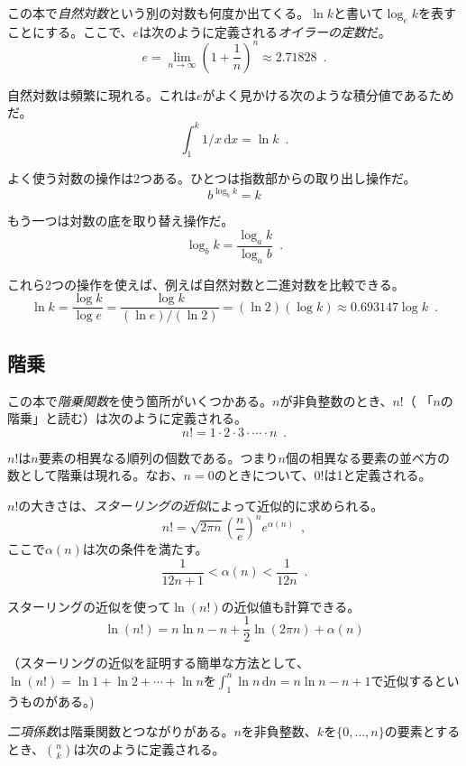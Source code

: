 %
%
この本で\emph{自然対数}という別の対数も何度か出てくる。$\ln k$と書いて$\log_e k$を表すことにする。ここで、$e$は次のように定義される\emph{オイラーの定数}だ。
%
%
\[
   e = \lim_{n\rightarrow\infty} \left(1+\frac{1}{n}\right)^n
   \approx  2.71828 \enspace .
\]

自然対数は頻繁に現れる。これは$e$がよく見かける次のような積分値であるためだ。
\[
    \int_{1}^{k} 1/x\,\mathrm{d}x  = \ln k \enspace .
\]

よく使う対数の操作は2つある。ひとつは指数部からの取り出し操作だ。
\[
    b^{\log_b k} = k
\]

もう一つは対数の底を取り替え操作だ。
\[
    \log_b k = \frac{\log_a k}{\log_a b} \enspace .
\]

これら2つの操作を使えば、例えば自然対数と二進対数を比較できる。
\[
   \ln k = \frac{\log k}{\log e} = \frac{\log k}{(\ln e)/(\ln 2)} =
    (\ln 2)(\log k) \approx 0.693147\log k \enspace .
\]

\subsection{階乗}

この本で\emph{階乗関数}を使う箇所がいくつかある。$n$が非負整数のとき、$n!$（ 「$n$の階乗」と読む）は次のように定義される。
\[
   n! = 1\cdot2\cdot3\cdot\cdots\cdot n \enspace .
\]

$n!$は$n$要素の相異なる順列の個数である。つまり$n$個の相異なる要素の並べ方の数として階乗は現れる。なお、$n=0$のときについて、$0!$は1と定義される。

%
$n!$の大きさは、\emph{スターリングの近似}によって近似的に求められる。
\[
	n!
   = \sqrt{2\pi n}\left(\frac{n}{e}\right)^{n}e^{\alpha(n)} \enspace ,
\]
ここで$\alpha(n)$は次の条件を満たす。
\[
   \frac{1}{12n+1} <  \alpha(n) < \frac{1}{12n}  \enspace .
\]

スターリングの近似を使って$\ln(n!)$の近似値も計算できる。
\[
   \ln(n!) = n\ln n - n + \frac{1}{2}\ln(2\pi n) + \alpha(n)
\]

（スターリングの近似を証明する簡単な方法として、$\ln(n!)=\ln 1 + \ln 2  + \cdots + \ln n$を$\int_1^n \ln n\,\mathrm{d}n = n\ln n - n +1$で近似するというものがある。)

%
\emph{二項係数}は階乗関数とつながりがある。$n$を非負整数、$k$を$\{0,\ldots,n\}$の要素とするとき、$\binom{n}{k}$は次のように定義される。

